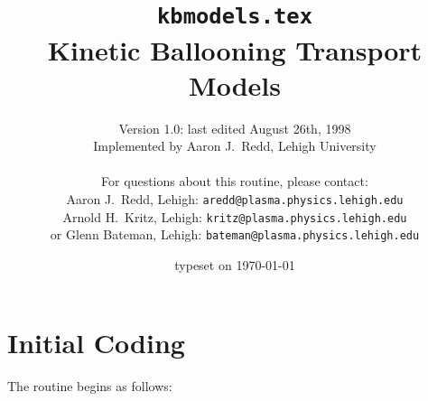 %

\headheight 0pt
\headsep 0pt
\topmargin 0pt
\oddsidemargin 0pt

\textheight 9.0in
\textwidth 6.5in

\title{ {\tt kbmodels.tex} \\ Kinetic Ballooning Transport Models}

\author{Version 1.0: last edited August 26th, 1998 \\ 
Implemented by Aaron J.~Redd, Lehigh University \\ \\
For questions about this routine, please contact: \\
Aaron J.~Redd, Lehigh:  {\tt aredd@plasma.physics.lehigh.edu} \\
Arnold H.~Kritz, Lehigh:  {\tt kritz@plasma.physics.lehigh.edu} \\
or Glenn Bateman, Lehigh:  {\tt bateman@plasma.physics.lehigh.edu}}

\date{typeset on \today}

\maketitle                 %

\section{Initial Coding}

The routine begins as follows:

